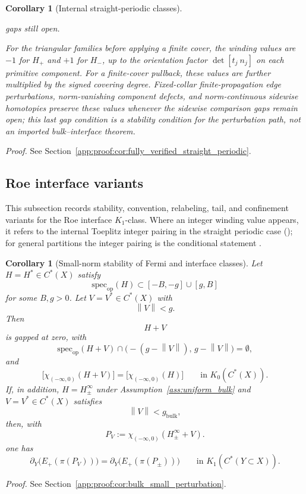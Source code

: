 \documentclass[11pt]{article}
\numberwithin{equation}{section}
\newtheorem{corollary}[theorem]{Corollary}
\theoremstyle{definition}
\theoremstyle{remark}
\newcommand{\proofref}[1]{%
  \par\noindent\emph{Proof.} See Section~\ref{#1}.\par\medskip
}
\newcommand{\proofappendixref}[1]{\proofref{#1}}
\newcommand{\spec}{\mathrm{spec}}
\newcommand{\opnorm}[1]{\left\lVert#1\right\rVert}
\begin{document}
\begin{corollary}[Internal straight-periodic classes]
\begin{enumerate}[label=(\alph*),leftmargin=2em]
  gaps still open.
\end{enumerate}
For the triangular families before applying a finite cover, the winding values are \(-1\) for
\(H_+\) and \(+1\) for \(H_-\), up to the orientation factor \(\det[t_j\ n_j]\) on each primitive
component. For a
finite-cover pullback, these values are further multiplied by the signed covering degree. Fixed-collar
finite-propagation edge perturbations, norm-vanishing component defects, and norm-continuous
sidewise homotopies preserve these values whenever the sidewise comparison gaps remain open; this
last gap condition is a stability condition for the perturbation path, not an imported
bulk--interface theorem.
\end{corollary}
\proofappendixref{app:proof:cor:fully_verified_straight_periodic}





\subsection{Roe interface variants}\label{app:roe_interface_variants}
This subsection records stability, convention, relabeling, tail, and confinement variants for the
Roe interface \(K_1\)-class. Where an integer winding value appears, it refers to the
internal Toeplitz integer pairing in the straight periodic case
(); for general partitions the integer pairing is the
conditional statement .
\begin{corollary}[Small-norm stability of Fermi and interface classes]\label{cor:bulk_small_perturbation}\label{cor:positive_interface_small_perturbation}
Let $H=H^*\in C^*(X)$ satisfy
\[
\spec_{\mathrm{op}}(H)\subset[-B,-g]\cup[g,B]
\]
for some $B,g>0$. Let $V=V^*\in C^*(X)$ with
\[
\opnorm{V}<g.
\]
Then
\[
H+V
\]
is gapped at zero, with
\[
\spec_{\mathrm{op}}(H+V)\cap\bigl(-(g-\opnorm V),\,g-\opnorm V\bigr)=\emptyset,
\]
and
\[
\bigl[\chi_{(-\infty,0)}(H+V)\bigr]
=
\bigl[\chi_{(-\infty,0)}(H)\bigr]
\qquad\text{in }K_0(C^*(X)).
\]
If, in addition, \(H=H_\pm^\infty\) under Assumption~\ref{ass:uniform_bulk} and \(V=V^*\in C^*(X)\)
satisfies
\[
\opnorm{V}<g_{\mathrm{bulk}},
\]
then, with
\[
P_V:=\chi_{(-\infty,0)}(H_\pm^\infty+V).
\]
one has
\[
\partial_Y\!\bigl(E_+(\pi(P_V))\bigr)
=
\partial_Y\!\bigl(E_+(\pi(P_\pm))\bigr)
\qquad\text{in }K_1(C^*(Y\subset X)).
\]
\end{corollary}
\proofappendixref{app:proof:cor:bulk_small_perturbation}
\end{document}
